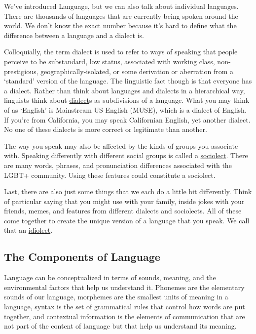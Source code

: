 \documentclass[
]{krantz}
\begin{document}
We've introduced Language, but we can also talk about individual languages. There are thousands of languages that are currently being spoken around the world. We don't know the exact number because it's hard to define what the difference between a language and a dialect is.

Colloquially, the term dialect is used to refer to ways of speaking that people perceive to be substandard, low status, associated with working class, non-prestigious, geographically-isolated, or some derivation or aberration from a `standard' version of the language. The linguistic fact though is that everyone has a dialect. Rather than think about languages and dialects in a hierarchical way, linguists think about \protect\hyperlink{dialect}{dialect}s as subdivisions of a language. What you may think of as `English' is Mainstream US English (MUSE), which is a dialect of English. If you're from California, you may speak Californian English, yet another dialect. No one of these dialects is more correct or legitimate than another.

The way you speak may also be affected by the kinds of groups you associate with. Speaking differently with different social groups is called a \protect\hyperlink{sociolect}{sociolect}. There are many words, phrases, and pronunciation differences associated with the LGBT+ community. Using these features could constitute a sociolect.

Last, there are also just some things that we each do a little bit differently. Think of particular saying that you might use with your family, inside jokes with your friends, memes, and features from different dialects and sociolects. All of these come together to create the unique version of a language that you speak. We call that an \protect\hyperlink{idiolect}{idiolect}.

\hypertarget{the-components-of-language}{%
\subsection*{The Components of Language}\label{the-components-of-language}}


Language can be conceptualized in terms of sounds, meaning, and the environmental factors that help us understand it. Phonemes are the elementary sounds of our language, morphemes are the smallest units of meaning in a language, syntax is the set of grammatical rules that control how words are put together, and contextual information is the elements of communication that are not part of the content of language but that help us understand its meaning.
\end{document}
